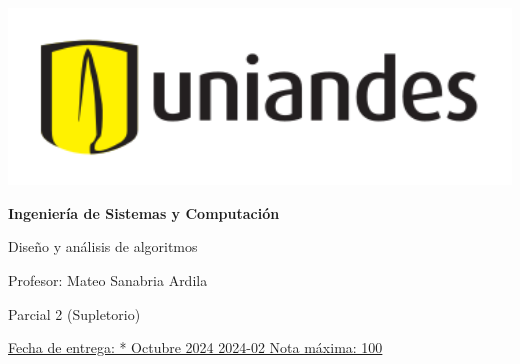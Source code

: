 \documentclass[12pt, a4paper]{exam}
\begin{document}
	\noindent
	\begin{minipage}[l]{0.1\textwidth}
		\noindent
		\includegraphics[width=1.8\textwidth]{Logosimbolo-uniandes_horizontal.png}
	\end{minipage}
\hfill
\begin{minipage}[c]{0.8\textwidth}
	\begin{center}
		{\large \textbf{Ingeniería de Sistemas y Computación} \par
		\large	Diseño y análisis de algoritmos	\par
		\small  Profesor: Mateo Sanabria Ardila	\par
		\small  Parcial 2 (Supletorio)	\par
		}
	\end{center}
\end{minipage}
\par
\vspace{0.2in}
\noindent
\uline{Fecha de entrega: * Octubre 2024	\hfill  2024-02		\hfill Nota máxima: 100}
\par 
\vspace{0.15in}
\end{document}
